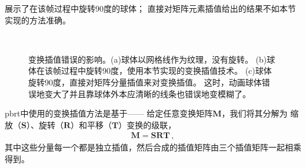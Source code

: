 展示了在该帧过程中旋转90度的球体；
直接对矩阵元素插值给出的结果不如本节实现的方法准确。
\begin{figure}[htbp]
    \raggedright
    \\%
    \quad%
    \begin{minipage}{0.45\textwidth}
        \vspace{-\linewidth}\caption{变换插值错误的影响。(a)球体以网格线作为纹理，没有旋转。
            (b)球体在该帧过程中旋转90度，使用本节实现的变换插值技术。
            (c)球体旋转90度，直接对矩阵分量插值来对变换插值。
            这时，动画球体错误地变大了并且靠球体外本应清晰的线条也错误地变模糊了。}
        \label{fig:2.16}
    \end{minipage}
\end{figure}

pbrt中使用的变换插值方法是基于——
给定任意变换矩阵$\bm M$，我们将其分解为
缩放（$\bm S$）、旋转（$\bm R$）和平移（$\bm T$）变换的级联，
\begin{align*}
    \bm M=\bm S\bm R\bm T\, ,
\end{align*}
其中这些分量每一个都是独立插值，然后合成的插值矩阵由三个插值矩阵一起相乘得到。